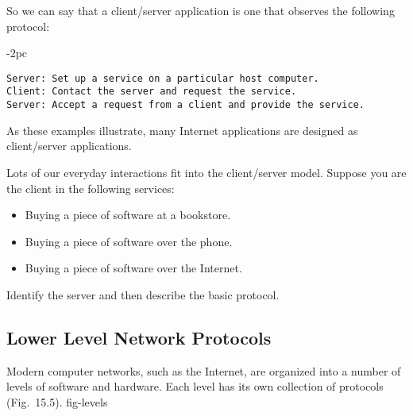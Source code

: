 So we can say that a client/server application is one that observes
the following protocol:

\begin{jjjlistingleft}[28pc]{-2pc}
\begin{lstlisting}
Server: Set up a service on a particular host computer.
Client: Contact the server and request the service.
Server: Accept a request from a client and provide the service.
\end{lstlisting}
\end{jjjlistingleft}


\noindent As these examples illustrate, many Internet applications are 
designed as client/server applications.



\label{self-study-exercise}
\begin{SSTUDY}

\item  Lots of our everyday interactions fit into the cli\-ent/ser\-ver
model.  Suppose you are the client in the following services:

\begin{itemize}
\item  Buying a piece of software at a bookstore.
\item  Buying a piece of software over the phone.
\item  Buying a piece of software over the Internet.
\end{itemize}

\noindent Identify the server and then describe the basic protocol.
\end{SSTUDY}

\subsection{Lower Level Network Protocols}
\noindent Modern computer networks, such as the Internet, are organized into a
number of levels of software and hardware.  Each level has its own
collection of protocols (Fig.~15.5).
{fig-levels}


